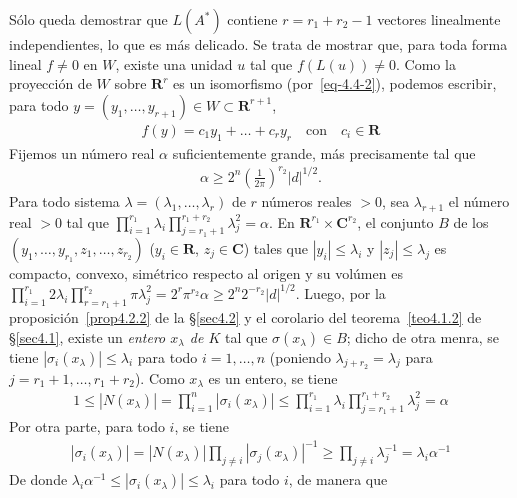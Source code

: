 \documentclass[bibtotoc,leqno,spanish]{amsbook}
\newcommand{\RR}{\mathbf{R}}
\newcommand{\CC}{\mathbf{C}}
\newcommand{\abs}[1]{\left\lvert#1\right\rvert}
\numberwithin{equation}{section}
\theoremstyle{note}
\theoremstyle{note}
\theoremstyle{rem}
\numberwithin{theorem}{section}
\numberwithin{proposition}{section}
\numberwithin{definition}{section}
\numberwithin{lemma}{section}
\numberwithin{corollary}{section}
\numberwithin{example}{section}
\numberwithin{footnote}{section}%
\begin{document}
S\'olo queda demostrar que $L(A^{*})$ contiene $r = r_{1}+r_{2}-1$ vectores linealmente independientes,
lo que es m\'as delicado. Se trata de mostrar que, para toda forma lineal $f\neq 0$ en $W$, existe una unidad
$u$ tal que $f(L(u))\neq 0$. Como la proyecci\'on de $W$ sobre $\RR^{r}$ es un isomorfismo
(por~\eqref{eq-4.4-2}), podemos escribir, para todo $y=(y_{1},\dots,y_{r+1})\in W\subset\RR^{r+1}$,
\begin{gather}\label{eq-4.4-3}
f(y) = c_{1}y_{1}+\dots+c_{r}y_{r}\quad\text{con}\quad c_{i}\in\RR
\end{gather}
Fijemos un n\'umero real $\alpha$ suficientemente grande, m\'as precisamente tal que
\begin{gather*}
\alpha\geq 2^{n}\left(\frac{1}{2\pi}\right)^{r_{2}}\abs{d}^{1/2}.
\end{gather*}
Para todo sistema $\lambda = (\lambda_{1},\dots,\lambda_{r})$ de $r$ n\'umeros reales $>0$, sea
$\lambda_{r+1}$ el n\'umero real $>0$ tal que $\prod_{i=1}^{r_{1}}\lambda_{i}\prod_{j=r_{1}+1}^{r_{1}+r_{2}}\lambda_{j}^{2}=\alpha$.
En $\RR^{r_{1}}\times\CC^{r_{2}}$, el conjunto $B$ de los $(y_{1},\dots,y_{r_{1}},z_{1},\dots,z_{r_{2}})$
($y_{i}\in\RR$, $z_{j}\in\CC$) tales que $\abs{y_{i}}\leq\lambda_{i}$ y $\abs{z_{j}}\leq\lambda_{j}$
es compacto, convexo, sim\'etrico respecto al origen y su vol\'umen es $\prod_{i=1}^{r_{1}}2\lambda_{i}
\prod_{r=r_{1}+1}^{r_{2}}\pi\lambda_{j}^{2}=2^{r}\pi^{r_{2}}\alpha\geq 2^{n}2^{-r_{2}}\abs{d}^{1/2}$.
Luego, por la proposici\'on~\ref{prop4.2.2} de la \S\ref{sec4.2} y
el corolario del teorema~\ref{teo4.1.2} de \S\ref{sec4.1}, existe un {\em entero $x_{\lambda}$
de $K$} tal que $\sigma(x_{\lambda})\in B$; dicho de otra menra, se tiene $\abs{\sigma_{i}(x_{\lambda})}
\leq\lambda_{i}$ para todo $i=1,\dots,n$ (poniendo $\lambda_{j+r_{2}}=\lambda_{j}$ para $j=r_{1}+1,\dots,r_{1}+r_{2}$).
Como $x_{\lambda}$ es un entero, se tiene
\begin{gather*}
1\leq\abs{N(x_{\lambda})}=\prod_{i=1}^{n}\abs{\sigma_{i}(x_{\lambda})}\leq\prod_{i=1}^{r_{1}}\lambda_{i}
\prod_{j=r_{1}+1}^{r_{1}+r_{2}}\lambda_{j}^{2}=\alpha
\end{gather*}
Por otra parte, para todo $i$, se tiene
\begin{gather*}
\abs{\sigma_{i}(x_{\lambda})}=\abs{N(x_{\lambda})}\prod_{j\neq i}\abs{\sigma_{j}(x_{\lambda})}^{-1}
\geq\prod_{j\neq i}\lambda_{j}^{-1}=\lambda_{i}\alpha^{-1}
\end{gather*}
De donde $\lambda_{i}\alpha^{-1}\leq\abs{\sigma_{i}(x_{\lambda})}\leq\lambda_{i}$ para todo $i$, de manera que
\end{document}
